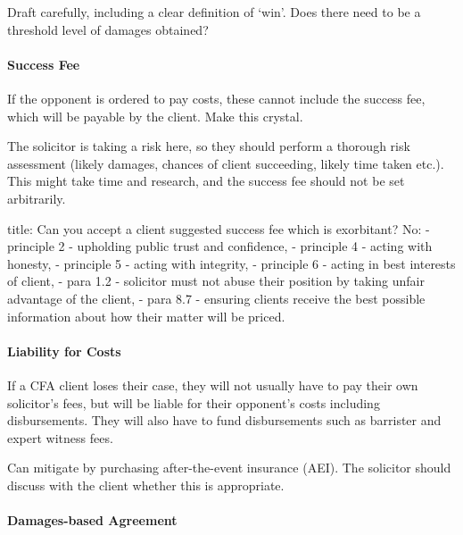 \documentclass[
]{article}
\newenvironment{Shaded}{}{}
\newcommand{\NormalTok}[1]{#1}
\begin{document}
Draft carefully, including a clear definition of `win'. Does there need
to be a threshold level of damages obtained?

\hypertarget{success-fee}{%
\paragraph{Success Fee}\label{success-fee}}

If the opponent is ordered to pay costs, these cannot include the
success fee, which will be payable by the client. Make this crystal.

The solicitor is taking a risk here, so they should perform a thorough
risk assessment (likely damages, chances of client succeeding, likely
time taken etc.). This might take time and research, and the success fee
should not be set arbitrarily.

\begin{Shaded}
\begin{Highlighting}[]
\NormalTok{title: Can you accept a client suggested success fee which is exorbitant?}
\NormalTok{No:}
\NormalTok{{-} principle 2 {-} upholding public trust and confidence, }
\NormalTok{{-} principle 4 {-} acting with honesty, }
\NormalTok{{-} principle 5 {-} acting with integrity, }
\NormalTok{{-} principle 6 {-} acting in best interests of client,}
\NormalTok{{-} para 1.2 {-} solicitor must not abuse their position by taking unfair advantage of the client, }
\NormalTok{{-} para 8.7 {-} ensuring clients receive the best possible information about how their matter will be priced.}
\end{Highlighting}
\end{Shaded}

\hypertarget{liability-for-costs}{%
\paragraph{Liability for Costs}\label{liability-for-costs}}

If a CFA client loses their case, they will not usually have to pay
their own solicitor's fees, but will be liable for their opponent's
costs including disbursements. They will also have to fund disbursements
such as barrister and expert witness fees.

Can mitigate by purchasing after-the-event insurance (AEI). The
solicitor should discuss with the client whether this is appropriate.

\hypertarget{damages-based-agreement}{%
\paragraph{Damages-based Agreement}\label{damages-based-agreement}}
\end{document}
